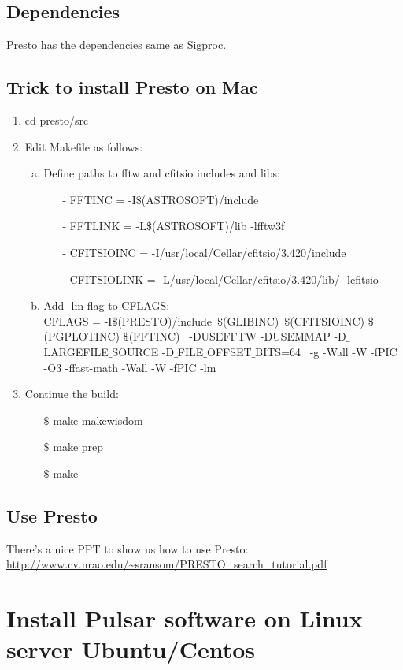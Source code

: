 \documentclass{article}
\begin{document}
\subsection{Dependencies}
Presto has the dependencies same as Sigproc. 
\subsection{Trick to install Presto on Mac}
\begin{enumerate}[1):]
\item cd presto/src
\item Edit Makefile as follows: \\
	\begin{enumerate}[a)]
	\item Define paths to fftw and cfitsio includes and libs:\\
		\begin{itemize}
		\item[-] FFTINC = -I$\$$(ASTROSOFT)/include
		\item[-] FFTLINK = -L$\$$(ASTROSOFT)/lib -lfftw3f
		\item[-] CFITSIOINC = -I/usr/local/Cellar/cfitsio/3.420/include
		\item[-] CFITSIOLINK = -L/usr/local/Cellar/cfitsio/3.420/lib/ -lcfitsio
		\end{itemize}
	\item Add -lm flag to CFLAGS: \\
		CFLAGS = -I$\$$(PRESTO)/include~$\$$(GLIBINC)~$\$$(CFITSIOINC) $\$$(PGPLOTINC) $\$$(FFTINC) \
        -DUSEFFTW -DUSEMMAP -D$\_$LARGEFILE$\_$SOURCE -D$\_$FILE$\_$OFFSET$\_$BITS=64 \
        -g -Wall -W -fPIC -O3 -ffast-math -Wall -W -fPIC -lm
	\end{enumerate}
\item Continue the build:
  \begin{itemize}
    \item[$\$$] make makewisdom
    \item[$\$$] make prep
    \item[$\$$] make 
   \end{itemize}
\end{enumerate}
\subsection{Use Presto}
There's a nice PPT to show us how to use Presto:
\url{http://www.cv.nrao.edu/~sransom/PRESTO_search_tutorial.pdf}

\section*{Install Pulsar software on Linux server Ubuntu/Centos}
\end{document}
